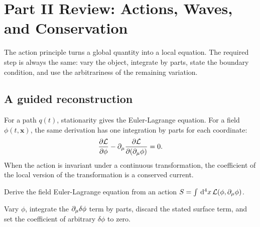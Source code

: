 
\chapter{Part II Review: Actions, Waves, and Conservation}

The action principle turns a global quantity into a local equation.  The required step is always the same: vary the object, integrate by parts, state the boundary condition, and use the arbitrariness of the remaining variation.

\section{A guided reconstruction}













For a path \(q(t)\), stationarity gives the Euler-Lagrange equation.  For a field \(\phi(t,\bm x)\), the same derivation has one integration by parts for each coordinate:
\[
  \frac{\partial\mathcal L}{\partial\phi}-\partial_\mu\frac{\partial\mathcal L}{\partial(\partial_\mu\phi)}=0.
\]
When the action is invariant under a continuous transformation, the coefficient of the local version of the transformation is a conserved current.

\begin{exercise}
Derive the field Euler-Lagrange equation from an action \(S=\int\,\mathrm d^4x\,\mathcal L(\phi,\partial_\mu\phi)\).
\begin{answer}
Vary \(\phi\), integrate the \(\partial_\mu\delta\phi\) term by parts, discard the stated surface term, and set the coefficient of arbitrary \(\delta\phi\) to zero.
\end{answer}
\end{exercise}
